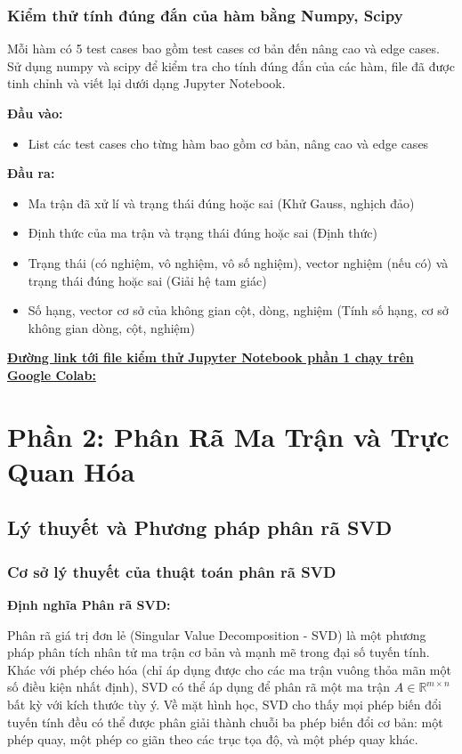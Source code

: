 \documentclass[a4paper]{article}
\begin{document}
\subsubsection{Kiểm thử tính đúng đắn của hàm bằng Numpy, Scipy}
Mỗi hàm có 5 test cases bao gồm test cases cơ bản đến nâng cao và edge cases. Sử dụng numpy và scipy để kiểm tra cho tính đúng đắn của các hàm, file đã được tinh chỉnh và viết lại dưới dạng Jupyter Notebook.

\textbf{Đầu vào: }

\begin{itemize}
    \item List các test cases cho từng hàm bao gồm cơ bản, nâng cao và edge cases
\end{itemize}

\textbf{Đầu ra: }

\begin{itemize}
    \item Ma trận đã xử lí và trạng thái đúng hoặc sai (Khử Gauss, nghịch đảo)
    \item Định thức của ma trận và trạng thái đúng hoặc sai (Định thức)
    \item Trạng thái (có nghiệm, vô nghiệm, vô số nghiệm), vector nghiệm (nếu có) và trạng thái đúng hoặc sai (Giải hệ tam giác)
    \item Số hạng, vector cơ sở của không gian cột, dòng, nghiệm (Tính số hạng, cơ sở không gian dòng, cột, nghiệm)
\end{itemize}

\href{https://colab.research.google.com/drive/1qCZZxnd9zFOq5GCkREtGi6zGgmdUA-VW?usp=sharing}{\textbf{Đường link tới file kiểm thử Jupyter Notebook phần 1 chạy trên Google Colab: }}


\section{Phần 2: Phân Rã Ma Trận và Trực Quan Hóa}
\subsection{Lý thuyết và Phương pháp phân rã SVD}

\subsubsection{Cơ sở lý thuyết của thuật toán phân rã SVD}

\textbf{Định nghĩa Phân rã SVD:}

Phân rã giá trị đơn lẻ (Singular Value Decomposition - SVD) là một phương pháp phân tích nhân tử ma trận cơ bản và mạnh mẽ trong đại số tuyến tính. Khác với phép chéo hóa (chỉ áp dụng được cho các ma trận vuông thỏa mãn một số điều kiện nhất định), SVD có thể áp dụng để phân rã một ma trận $A \in \mathbb{R}^{m \times n}$ bất kỳ với kích thước tùy ý. Về mặt hình học, SVD cho thấy mọi phép biến đổi tuyến tính đều có thể được phân giải thành chuỗi ba phép biến đổi cơ bản: một phép quay, một phép co giãn theo các trục tọa độ, và một phép quay khác.
\end{document}
